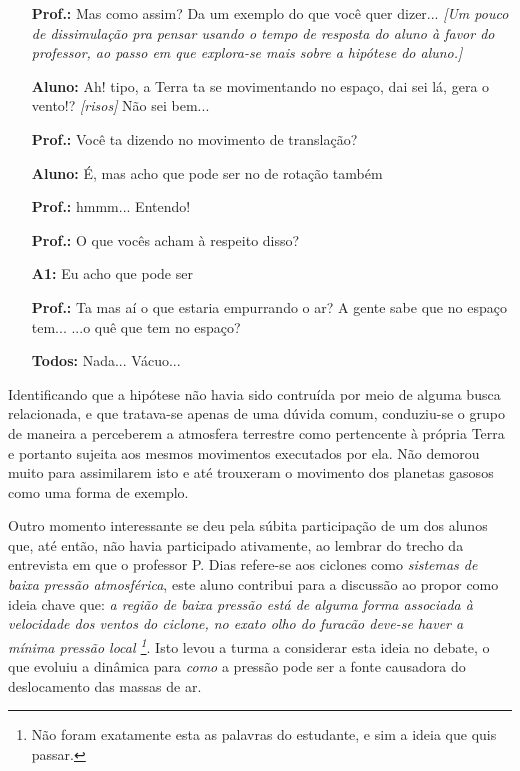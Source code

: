\begin{center}
	\begin{minipage}{.9\textwidth}
		\begin{itemize}
			\item [\textbf{Prof.:}] Mas como assim? Da um exemplo do que você quer dizer... \textit{[Um pouco de dissimulação pra pensar usando o tempo de resposta do aluno à favor do professor, ao passo em que explora-se mais sobre a hipótese do aluno.]}
			\item [\textbf{Aluno:}] Ah! tipo, a Terra ta se movimentando no espaço, dai sei lá, gera o vento!? \textit{[risos]} Não sei bem...
			\item [\textbf{Prof.:}] Você ta dizendo no movimento de translação?
			\item [\textbf{Aluno:}] É, mas acho que pode ser no de rotação também
			\item [\textbf{Prof.:}] hmmm... Entendo!
			\item [\textbf{Prof.:}] O que vocês acham à respeito disso?
			\item [\textbf{A1:}] Eu acho que pode ser
			\item [\textbf{Prof.:}] Ta mas aí o que estaria empurrando o ar? A gente sabe que no espaço tem... ...o quê que tem no espaço?
			\item [\textbf{Todos:}] Nada... Vácuo...
		\end{itemize}
	\end{minipage}
\end{center}


Identificando que a hipótese não havia sido contruída por meio de alguma busca relacionada, e que tratava-se apenas de uma dúvida comum, conduziu-se o grupo de maneira a perceberem a atmosfera terrestre como pertencente à própria Terra e portanto sujeita aos mesmos movimentos executados por ela. Não demorou muito para assimilarem isto e até trouxeram o movimento dos planetas gasosos como uma forma de exemplo.

Outro momento interessante se deu pela súbita participação de um dos alunos que, até então, não havia participado ativamente, ao lembrar do trecho da entrevista em que o professor P. Dias refere-se aos ciclones como \textit{sistemas de baixa pressão atmosférica}, este aluno contribui para a discussão ao propor como ideia chave que: \textit{a região de baixa pressão está de alguma forma associada à velocidade dos ventos do ciclone, no exato olho do furacão deve-se haver a mínima pressão local \footnote{Não foram exatamente esta as palavras do estudante, e sim a ideia que quis passar.}}. Isto levou a turma a considerar esta ideia no debate, o que evoluiu a dinâmica para \textit{como} a pressão pode ser a fonte causadora do deslocamento das massas de ar.


